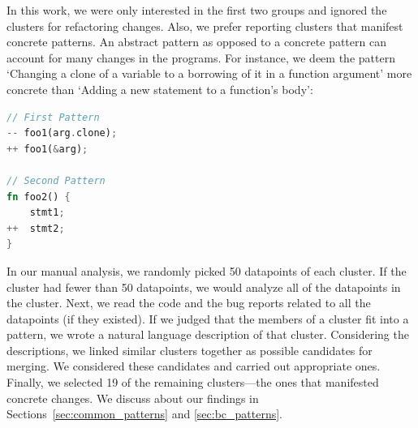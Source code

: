 In this work, we were only interested in the first two groups and ignored the clusters for refactoring changes. Also, we prefer reporting clusters that manifest concrete patterns. An abstract pattern as opposed to a concrete pattern can account for many changes in the programs. For instance, we deem the pattern `Changing a clone of a variable to a borrowing of it in a function argument' more concrete than `Adding a new statement to a function's body':

\begin{lstlisting}[language=Rust, style=colouredRust]
// First Pattern
-- foo1(arg.clone);
++ foo1(&arg);

// Second Pattern
fn foo2() {
    stmt1;
++  stmt2;
}

\end{lstlisting}


In our manual analysis, we randomly picked 50 datapoints of each cluster. If the cluster had fewer than 50 datapoints, we would analyze all of the datapoints in the cluster. Next, we read the code and the bug reports related to all the datapoints (if they existed). If we judged that the members of a cluster fit into a pattern, we wrote a natural language description of that cluster. Considering the descriptions, we linked similar clusters together as possible candidates for merging. We considered these candidates and carried out appropriate ones. Finally, we selected 19 of the remaining clusters---the ones that manifested concrete changes. We discuss about our findings in Sections~\ref{sec:common_patterns} and \ref{sec:bc_patterns}.

